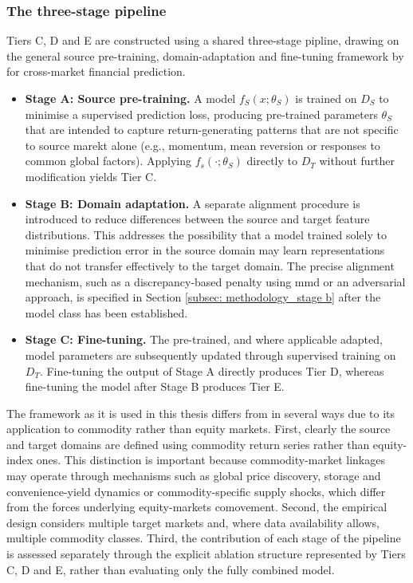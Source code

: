 \subsubsection{The three-stage pipeline} \label{subsubsec: methodology_three stage pipeline}
Tiers C, D and E are constructed using a shared three-stage pipline, drawing on the general source pre-training, domain-adaptation and fine-tuning framework by \textcite{mashettyTransferLearningCrossMarket2025a} for cross-market financial prediction.
\begin{itemize}
    \item \textbf{Stage A: Source pre-training.} A model $f_S(x; \theta_S)$ is trained on $D_S$ to minimise a supervised prediction loss, producing pre-trained parameters $\theta_S$ that are intended to capture return-generating patterns that are not specific to source marekt alone (e.g., momentum, mean reversion or responses to common global factors). Applying $f_s(\cdot;\theta_S)$ directly to $D_T$ without further modification yields Tier C.
    \item \textbf{Stage B: Domain adaptation.} A separate alignment procedure is introduced to reduce differences between the source and target feature distributions. This addresses the possibility that a model trained solely to minimise prediction error in the source domain may learn representations that do not transfer effectively to the target domain. The precise alignment mechanism, such as a discrepancy-based penalty using \ac{mmd} or an adversarial approach, is specified in Section \ref{subsec: methodology_stage b} after the model class has been established.
    \item \textbf{Stage C: Fine-tuning.} The pre-trained, and where applicable adapted, model parameters are subsequently updated through supervised training on $D_T$. Fine-tuning the output of Stage A directly produces Tier D, whereas fine-tuning the model after Stage B produces Tier E.
\end{itemize}

\noindent The framework as it is used in this thesis differs from \textcite{mashettyTransferLearningCrossMarket2025a} in several ways due to its application to commodity rather than equity markets. First, clearly the source and target domains are defined using commodity return series rather than equity-index ones. This distinction is important because commodity-market linkages may operate through mechanisms such as global price discovery, storage and convenience-yield dynamics or commodity-specific supply shocks, which differ from the forces underlying equity-markets comovement. Second, the empirical design considers multiple target markets and, where data availability allows, multiple commodity classes. Third, the contribution of each stage of the pipeline is assessed separately through the explicit ablation structure represented by Tiers C, D and E, rather than evaluating only the fully combined model. 


